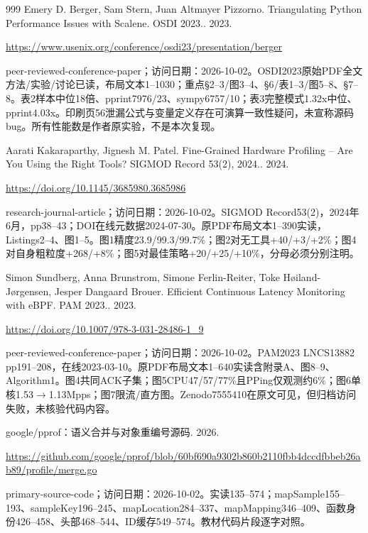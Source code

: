 \documentclass[UTF8,fontset=fandol,openany,11pt]{ctexbook}
\begin{document}
\begin{thebibliography}{999}
 Emery D. Berger, Sam Stern, Juan Altmayer Pizzorno. Triangulating Python Performance Issues with Scalene. OSDI 2023.. 2023.\par
\url{https://www.usenix.org/conference/osdi23/presentation/berger}\par
{\small peer-reviewed-conference-paper；访问日期：2026-10-02。OSDI2023原始PDF全文方法/\allowbreak{}实验/\allowbreak{}讨论已读，布局文本1–1030；重点§2–3/\allowbreak{}图3–4、§6/\allowbreak{}表1–3/\allowbreak{}图5–8、§7–8。表2样本中位18倍、pprint7976/\allowbreak{}23、sympy6757/\allowbreak{}10；表3完整模式1.\allowbreak{}32x中位、pprint4.\allowbreak{}03x。印刷页56泄漏公式与变量定义存在可演算一致性疑问，未宣称源码bug。所有性能数是作者原实验，不是本次复现。}

 Aarati Kakaraparthy, Jignesh M. Patel. Fine-Grained Hardware Profiling – Are You Using the Right Tools? SIGMOD Record 53(2), 2024.. 2024.\par
\url{https://doi.org/10.1145/3685980.3685986}\par
{\small research-journal-article；访问日期：2026-10-02。SIGMOD Record53(2)，2024年6月，pp38–43；DOI在线元数据2024-\allowbreak{}07-\allowbreak{}30。原PDF布局文本1–390实读，Listings2–4、图1–5。图1精度23.\allowbreak{}9/\allowbreak{}99.\allowbreak{}3/\allowbreak{}99.\allowbreak{}7\%；图2对无工具+40/\allowbreak{}+3/\allowbreak{}+2\%；图4对自身粗粒度+268/\allowbreak{}+8\%；图5对最佳策略+20/\allowbreak{}+25/\allowbreak{}+10\%，分母必须分别注明。}

 Simon Sundberg, Anna Brunstrom, Simone Ferlin-Reiter, Toke Høiland-Jørgensen, Jesper Dangaard Brouer. Efficient Continuous Latency Monitoring with eBPF. PAM 2023.. 2023.\par
\url{https://doi.org/10.1007/978-3-031-28486-1_9}\par
{\small peer-reviewed-conference-paper；访问日期：2026-10-02。PAM2023 LNCS13882 pp191–208，在线2023-\allowbreak{}03-\allowbreak{}10。原PDF布局文本1–640实读含附录A、图8–9、Algorithm1。图4共同ACK子集；图5CPU47/\allowbreak{}57/\allowbreak{}77\%且PPing仅观测约6\%；图6单核1.\allowbreak{}53\ensuremath{\rightarrow}\allowbreak{}\allowbreak{}1.\allowbreak{}13Mpps；图7限流/\allowbreak{}直方图。Zenodo7555\allowbreak{}410在原文可见，但归档访问失败，未核验代码内容。}

 google/pprof：语义合并与对象重编号源码. 2026.\par
\url{https://github.com/google/pprof/blob/60bf690a9302b860b2110fbb4dccdfbbeb26ab89/profile/merge.go}\par
{\small primary-source-code；访问日期：2026-10-02。实读135–574；mapSample155–193、sampleKey196–245、mapLocatio\allowbreak{}n284–337、mapMapping\allowbreak{}346–409、函数身份426–458、头部468–544、ID缓存549–574。教材代码片段逐字对照。}


\end{thebibliography}
\end{document}

